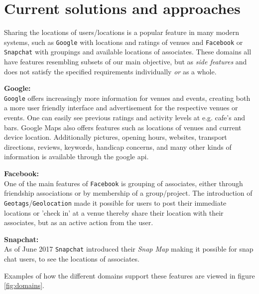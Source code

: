 \section{Current solutions and approaches}




Sharing the locations of users/locations is a popular feature in many modern systems, such as \texttt{Google} with locations and ratings of venues and \texttt{Facebook} or \texttt{Snapchat} with groupings and available locations of associates. These domains all have features resembling subsets of our main objective, but as \textit{side features} and does not satisfy the specified requirements individually \textit{or} as a whole.

\textbf{Google: }\\
\texttt{Google} offers increasingly more information for venues and events, creating both a more user friendly interface and advertisement for the respective venues or events. One can easily see previous ratings and activity levels at e.g. cafe's and bars. Google Maps also offers features such as locations of venues and current device location. 
Additionally pictures, opening hours, websites, transport directions, reviews, keywords, handicap concerns, and many other kinds of information is available through the google api. 

\textbf{Facebook: }\\
One of the main features of \texttt{Facebook} is grouping of associates, either through friendship associations or by membership of a group/project. The introduction of \texttt{Geotags}/\texttt{Geolocation} made it possible for users to post their immediate locations or 'check in' at a venue thereby share their location with their associates, but as an active action from the user.


\textbf{Snapchat: }\\
As of June 2017 \texttt{Snapchat} introduced their \textit{Snap Map} making it possible for snap chat users, to see the locations of associates. 

\vspace{1cm}
Examples of how the different domains support these features are viewed in figure \ref{fig:domains}.


